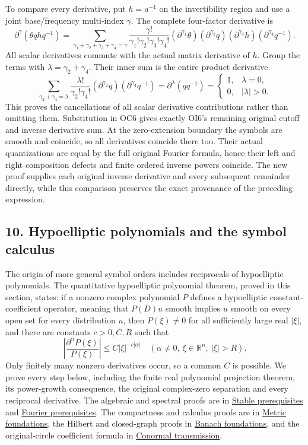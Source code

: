 \documentclass[
  11pt,
]{article}
\begin{document}
To compare every derivative, put \(h=a^{-1}\) on the invertibility
region and use a joint base/frequency multi-index \(\gamma\). The
complete four-factor derivative is \[
\partial^\gamma(\theta q h q^{-1})
=\sum_{\gamma_1+\gamma_2+\gamma_3+\gamma_4=\gamma}
\frac{\gamma!}{\gamma_1!\gamma_2!\gamma_3!\gamma_4!}
(\partial^{\gamma_1}\theta)(\partial^{\gamma_2}q)
(\partial^{\gamma_3}h)(\partial^{\gamma_4}q^{-1}).
\tag{OC6}
\] All scalar derivatives commute with the actual matrix derivative of
\(h\). Group the terms with \(\lambda=\gamma_2+\gamma_4\). Their inner
sum is the entire product derivative \[
\sum_{\gamma_2+\gamma_4=\lambda}
\frac{\lambda!}{\gamma_2!\gamma_4!}
(\partial^{\gamma_2}q)(\partial^{\gamma_4}q^{-1})
=\partial^\lambda(qq^{-1})
=\begin{cases}1,&\lambda=0,\\0,&|\lambda|>0.\end{cases}
\tag{OC7}
\] This proves the cancellations of all scalar derivative contributions
rather than omitting them. Substitution in OC6 gives exactly OI6's
remaining original cutoff and inverse derivative sum. At the
zero-extension boundary the symbols are smooth and coincide, so all
derivatives coincide there too. Their actual quantizations are equal by
the full original Fourier formula, hence their left and right
composition defects and finite ordered inverse powers coincide. The new
proof supplies each original inverse derivative and every subsequent
remainder directly, while this comparison preserves the exact provenance
of the preceding expression.

\subsection{10. Hypoelliptic polynomials and the symbol
calculus}\label{hypoelliptic-polynomials-and-the-symbol-calculus}

The origin of more general symbol orders includes reciprocals of
hypoelliptic polynomials. The quantitative hypoelliptic polynomial
theorem, proved in this section, states: if a nonzero complex polynomial
\(P\) defines a hypoelliptic constant-coefficient operator, meaning that
\(P(D)u\) smooth implies \(u\) smooth on every open set for every
distribution \(u\), then \(P(\xi)\ne0\) for all sufficiently large real
\(|\xi|\), and there are constants \(c>0,C,R\) such that \[
\left|\frac{\partial^\alpha P(\xi)}{P(\xi)}\right|
\leq C|\xi|^{-c|\alpha|}
\quad (\alpha\ne0,\ \xi\in\mathbb R^n,\ |\xi|>R).
\tag{E48}
\] Only finitely many nonzero derivatives occur, so a common \(C\) is
possible. We prove every step below, including the finite real
polynomial projection theorem, its power-growth consequence, the
original complex-zero separation and every reciprocal derivative. The
algebraic and spectral proofs are in
\href{stable-prerequisite-bridges.pdf\#section*.24}{Stable
prerequisites} and
\href{prerequisite-bridges.pdf\#section*.4}{Fourier
prerequisites}. The compactness and calculus proofs are in
\href{metric-foundation-bridges.pdf\#section*.42}{Metric
foundations}, the Hilbert and closed-graph proofs in
\href{banach-foundation-bridges.pdf\#section*.54}{Banach
foundations}, and the original-circle coefficient formula in
\href{conormal-transmission.pdf\#section*.84}{Conormal
transmission}.
\end{document}
